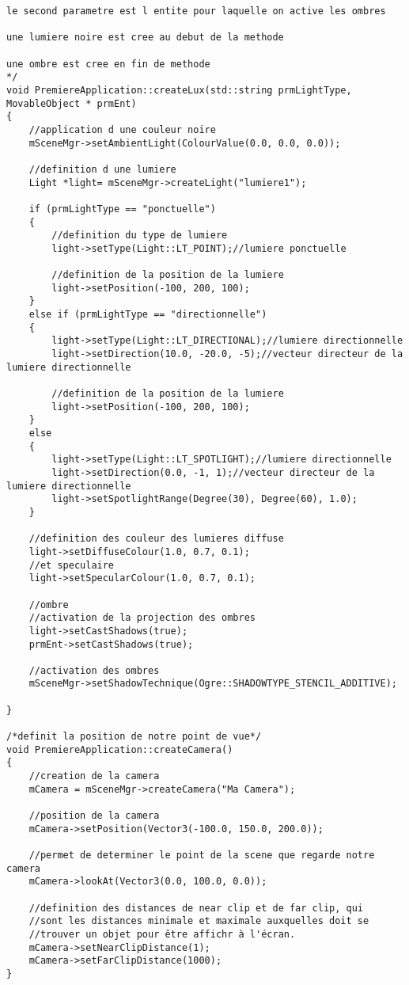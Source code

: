 \begin{lstlisting}[caption={PremiereApplication.cpp: ajout d'une m\'ethode pour la gestion de lumi\`ere et des ombres}]
    le second parametre est l entite pour laquelle on active les ombres

une lumiere noire est cree au debut de la methode

une ombre est cree en fin de methode
*/
void PremiereApplication::createLux(std::string prmLightType, MovableObject * prmEnt)
{
    //application d une couleur noire
    mSceneMgr->setAmbientLight(ColourValue(0.0, 0.0, 0.0)); 

    //definition d une lumiere 
    Light *light= mSceneMgr->createLight("lumiere1");

    if (prmLightType == "ponctuelle")
    {
        //definition du type de lumiere
        light->setType(Light::LT_POINT);//lumiere ponctuelle

        //definition de la position de la lumiere
        light->setPosition(-100, 200, 100);
    }
    else if (prmLightType == "directionnelle")
    {
        light->setType(Light::LT_DIRECTIONAL);//lumiere directionnelle
        light->setDirection(10.0, -20.0, -5);//vecteur directeur de la lumiere directionnelle

        //definition de la position de la lumiere
        light->setPosition(-100, 200, 100);
    }
    else
    {
        light->setType(Light::LT_SPOTLIGHT);//lumiere directionnelle
        light->setDirection(0.0, -1, 1);//vecteur directeur de la lumiere directionnelle
        light->setSpotlightRange(Degree(30), Degree(60), 1.0);
    }

    //definition des couleur des lumieres diffuse
    light->setDiffuseColour(1.0, 0.7, 0.1);
    //et speculaire
    light->setSpecularColour(1.0, 0.7, 0.1);

    //ombre
    //activation de la projection des ombres
    light->setCastShadows(true);
    prmEnt->setCastShadows(true);

    //activation des ombres
    mSceneMgr->setShadowTechnique(Ogre::SHADOWTYPE_STENCIL_ADDITIVE);

}

/*definit la position de notre point de vue*/
void PremiereApplication::createCamera()
{
    //creation de la camera
    mCamera = mSceneMgr->createCamera("Ma Camera");

    //position de la camera
    mCamera->setPosition(Vector3(-100.0, 150.0, 200.0));

    //permet de determiner le point de la scene que regarde notre camera
    mCamera->lookAt(Vector3(0.0, 100.0, 0.0));

    //definition des distances de near clip et de far clip, qui
    //sont les distances minimale et maximale auxquelles doit se
    //trouver un objet pour être affichr à l'écran.
    mCamera->setNearClipDistance(1);
    mCamera->setFarClipDistance(1000);
}


\end{lstlisting}
